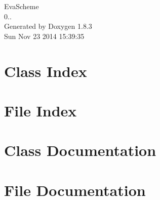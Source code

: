 \documentclass{book}
\begin{document}
\hypersetup{pageanchor=false,citecolor=blue}
\begin{titlepage}
\vspace*{7cm}
\begin{center}
{\Large Eva\-Scheme \\[1ex]\large 0.. }\\
\vspace*{1cm}
{\large Generated by Doxygen 1.8.3}\\
\vspace*{0.5cm}
{\small Sun Nov 23 2014 15:39:35}\\
\end{center}
\end{titlepage}
\clearemptydoublepage
{}
\tableofcontents
\clearemptydoublepage
{}
\hypersetup{pageanchor=true,citecolor=blue}
\chapter{Class Index}

\chapter{File Index}

\chapter{Class Documentation}






















\chapter{File Documentation}




\printindex
\end{document}
